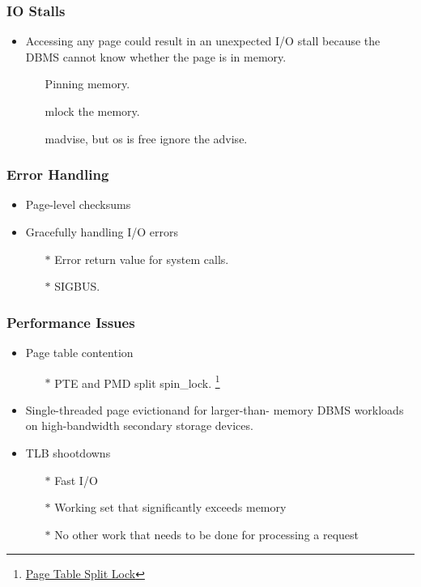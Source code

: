 \documentclass[10pt,svgnames,fragile]{beamer}
\begin{document}
\begin{frame}
	\frametitle{IO Stalls}
	\begin{itemize}
		\item Accessing any page could result in an unexpected I/O stall because the DBMS cannot know whether the page is in memory.
		\begin{itemize}
			\item[\checkmark] Pinning memory.
			\item[\checkmark] mlock the memory.
			\item[\checkmark] madvise, but os is free ignore the advise.
		\end{itemize}
	\end{itemize}
\end{frame}

\begin{frame}
	\frametitle{Error Handling}
	\begin{itemize}
		\item Page-level checksums
		\item Gracefully handling I/O errors
		\begin{itemize}
			\item[$\ast$] Error return value for system calls.
			\item[$\ast$] SIGBUS.
		\end{itemize}
	\end{itemize}
\end{frame}

\begin{frame}
	\frametitle{Performance Issues}
	\begin{itemize}
		\item Page table contention
		\begin{itemize}
			\item[$\ast$] PTE and PMD split spin\_lock. \footnote[frame]{\href{https://www.kernel.org/doc/html/latest/vm/split_page_table_lock.html}{Page Table Split Lock}}
		\end{itemize}
		\item Single-threaded page evictionand for larger-than- memory DBMS workloads on high-bandwidth secondary storage devices.
		\item TLB shootdowns
		\begin{itemize}
			\item[$\ast$] Fast I/O
			\item[$\ast$] Working set that significantly exceeds memory
			\item[$\ast$] No other work that needs to be done for processing a request
			
		\end{itemize}
	\end{itemize}
\end{frame}
\end{document}
